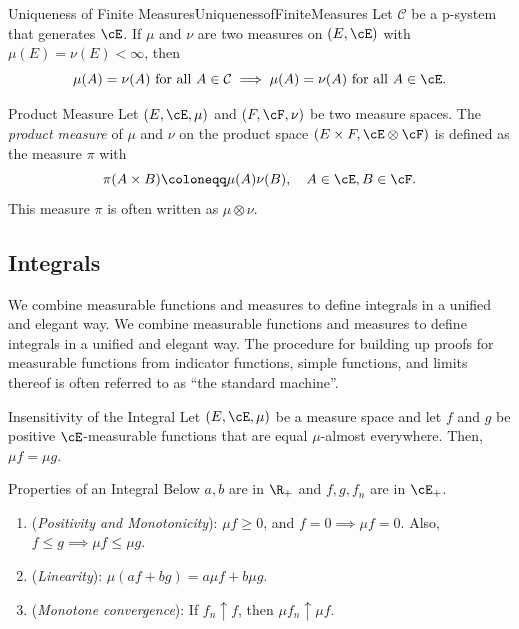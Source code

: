 \begin{thm}{Uniqueness of Finite Measures}{UniquenessofFiniteMeasures}
	Let $\mathcal{C}$ be a p-system that generates $\cE$. If $\mu$ and $\nu$ are two measures on $(E, \cE)$ with $\mu(E) = \nu(E) < \infty$, then
	\begin{equation*}
		\mu(A) = \nu(A) \text{ for all } A \in \mathcal{C} \implies \mu(A) = \nu(A) \text{ for all } A \in \cE.
	\end{equation*}
\end{thm}

\begin{defn}{Product Measure}{}
	Let $(E, \cE, \mu)$ and $(F, \cF, \nu)$ be two measure spaces. The \textit{product measure} of $\mu$ and $\nu$ on the product space $(E \times F, \cE \otimes \cF)$ is defined as the measure $\pi$ with
	\begin{equation}
		\pi(A \times B) \coloneqq \mu(A) \nu(B), \quad A \in \cE, B \in \cF.
		\label{eq:ProductMeasureDef}
	\end{equation}
	This measure $\pi$ is often written as $\mu \otimes \nu$.
\end{defn}

\subsection{Integrals}
We combine measurable functions and measures to define integrals in a unified and elegant way. We combine measurable functions and measures to define integrals
in a unified and elegant way. The procedure for building up proofs for measurable functions from indicator functions, simple functions, and limits thereof is often referred to as “the standard machine”.

\begin{prop}{Insensitivity of the Integral}{}
	Let $(E, \cE, \mu)$ be a measure space and let $f$ and $g$ be positive $\cE$-measurable functions that are equal $\mu$-almost everywhere. Then, $\mu f = \mu g$.
\end{prop}

\begin{thm}{Properties of an Integral}{}
	Below $a, b$ are in $\R_+$ and $f, g, f_n$ are in $\cE_+$.
	\begin{enumerate}
		\item (\textit{Positivity and Monotonicity}): $\mu f \ge 0$, and $f = 0 \implies \mu f = 0$. Also, $f \le g \implies \mu f \le \mu g$.
		\item (\textit{Linearity}): $\mu(af + bg) = a \mu f + b \mu g$.
		\item (\textit{Monotone convergence}): If $f_n \uparrow f$, then $\mu f_n \uparrow \mu f$.
	\end{enumerate}
\end{thm}

